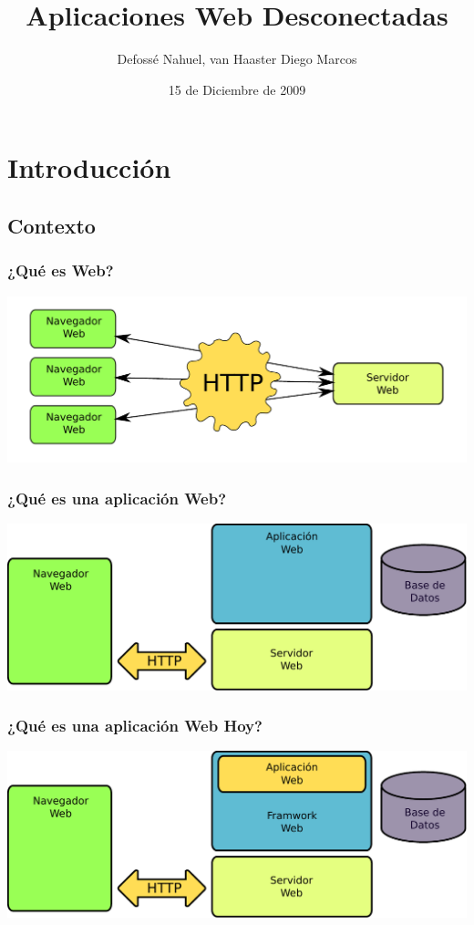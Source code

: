 \documentclass{beamer}
\begin{document}
\title{Aplicaciones Web Desconectadas}
\author{Defossé Nahuel, van Haaster Diego Marcos}
\date{15 de Diciembre de 2009}

\begin{frame}
\titlepage
\end{frame}


\section{Introducción}
\subsection{Contexto}

\begin{frame}
    \frametitle{¿Qué es Web?}
    \includegraphics[scale=0.5]{intro.pdf}
\end{frame}
    

\begin{frame}
    \frametitle{¿Qué es una aplicación Web?}
    \includegraphics[scale=0.5]{general.pdf}
\end{frame}

\begin{frame}
    \frametitle{¿Qué es una aplicación Web Hoy?}
    \includegraphics[scale=0.5]{general_con_fw.pdf}
\end{frame}
\end{document}
